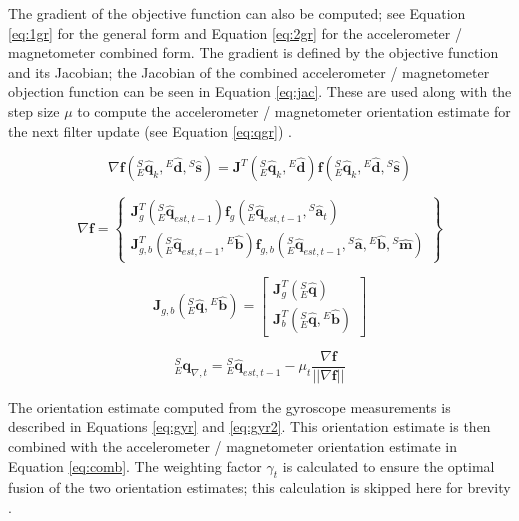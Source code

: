 \documentclass[11pt]{ucthesisCP}
\begin{document}
The gradient of the objective function can also be computed; see Equation \ref{eq:1gr} for the general form and Equation \ref{eq:2gr} for the accelerometer / magnetometer combined form. The gradient is defined by the objective function and its Jacobian; the Jacobian of the combined accelerometer / magnetometer objection function can be seen in Equation \ref{eq:jac}. These are used along with the step size \(\mu\) to compute the accelerometer / magnetometer orientation estimate for the next filter update (see Equation \ref{eq:qgr}) \cite{madgwick}.

\begin{equation} \label{eq:1gr}
\nabla \mathbf{f}({}^S_E\hat{\mathbf{q}}_k, {}^E\hat{\mathbf{d}}, {}^S\hat{\mathbf{s}}) = \mathbf{J}^T({}^S_E\hat{\mathbf{q}}_k, {}^E\hat{\mathbf{d}})\mathbf{f}({}^S_E\hat{\mathbf{q}}_k, {}^E\hat{\mathbf{d}}, {}^S\hat{\mathbf{s}})
\end{equation}

\begin{equation} \label{eq:2gr}
\nabla \mathbf{f} = \begin{Bmatrix}
	\mathbf{J}_g^T({}^S_E\hat{\mathbf{q}}_{est,t-1})\mathbf{f}_g({}^S_E\hat{\mathbf{q}}_{est,t-1}, {}^S\hat{\mathbf{a}}_t) \\
	\mathbf{J}_{g,b}^T({}^S_E\hat{\mathbf{q}}_{est,t-1}, {}^E\hat{\mathbf{b}}) \mathbf{f}_{g,b}({}^S_E\hat{\mathbf{q}}_{est,t-1}, {}^S\hat{\mathbf{a}}, {}^E\hat{\mathbf{b}}, {}^S\hat{\mathbf{m}})
\end{Bmatrix}
\end{equation}

\begin{equation} \label{eq:jac}
\mathbf{J}_{g,b}({}^S_E\hat{\mathbf{q}}, {}^E\hat{\mathbf{b}}) = \begin{bmatrix}
	\mathbf{J}_g^T({}^S_E\hat{\mathbf{q}}) \\
	\mathbf{J}_b^T({}^S_E\hat{\mathbf{q}}, {}^E\hat{\mathbf{b}})
\end{bmatrix}
\end{equation}

\begin{equation} \label{eq:qgr}
{}^S_E\mathbf{q}_{\nabla,t} = {}^S_E\hat{\mathbf{q}}_{est,t-1} - \mu_t \frac{\nabla \mathbf{f}}{||\nabla \mathbf{f}||}
\end{equation}

The orientation estimate computed from the gyroscope measurements is described in Equations \ref{eq:gyr} and \ref{eq:gyr2}. This orientation estimate is then combined with the accelerometer / magnetometer orientation estimate in Equation \ref{eq:comb}. The weighting factor \(\gamma_t\) is calculated to ensure the optimal fusion of the two orientation estimates; this calculation is skipped here for brevity \cite{madgwick}.
\end{document}
